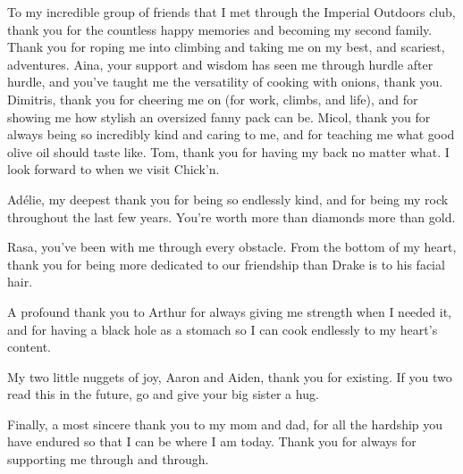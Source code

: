 \begin{acknowledgements}
    To my incredible group of friends that I met through the Imperial Outdoors club, thank you for the countless happy memories and becoming my second family. Thank you for roping me into climbing and taking me on my best, and scariest, adventures. Aina, your support and wisdom has seen me through hurdle after hurdle, and you've taught me the versatility of cooking with onions, thank you. Dimitris, thank you for cheering me on (for work, climbs, and life), and for showing me how stylish an oversized fanny pack can be. Micol, thank you for always being so incredibly kind and caring to me, and for teaching me what good olive oil should taste like. Tom, thank you for having my back no matter what. I look forward to when we visit Chick’n. 
    
    Adélie, my deepest thank you for being so endlessly kind, and for being my rock throughout the last few years. You’re worth more than diamonds more than gold. 
    
    Rasa, you’ve been with me through every obstacle. From the bottom of my heart, thank you for being more dedicated to our friendship than Drake is to his facial hair. 
    
    A profound thank you to Arthur for always giving me strength when I needed it, and for having a black hole as a stomach so I can cook endlessly to my heart’s content. 
    
    My two little nuggets of joy, Aaron and Aiden, thank you for existing. If you two read this in the future, go and give your big sister a hug.
    
    Finally, a most sincere thank you to my mom and dad, for all the hardship you have endured so that I can be where I am today. Thank you for always for supporting me through and through. 
\end{acknowledgements}

\tableofcontents

